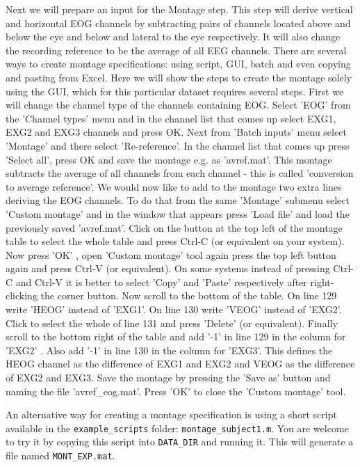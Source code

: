 Next we will prepare an input for the Montage step. This step will derive vertical and horizontal EOG channels by subtracting pairs of channels located above and below the eye and below and lateral to the eye respectively. It will also change the recording reference to be the average of all EEG channels. There are several ways to create montage specifications: using script, GUI, batch and even copying and pasting from Excel. Here we will show the steps to create the montage solely using the GUI, which for this particular dataset requires several steps. First we will change the channel type of the channels containing EOG. Select  'EOG' from the 'Channel types' menu and in the channel list that comes up select EXG1, EXG2 and EXG3 channels and press OK. Next  from 'Batch inputs' menu select 'Montage' and there select 'Re-reference'. In the channel list that comes up press 'Select all', press OK and save the montage e.g. as 'avref.mat'. This montage subtracts the average of all channels from each channel - this is called 'conversion to average reference'. We would now like to add to the montage two extra lines deriving the EOG channels. To do that from the same 'Montage' submenu select 'Custom montage' and in the window that appears press 'Load file' and load the previously saved 'avref.mat'.  Click on the button at the top left of the montage table to select the whole table and press Ctrl-C (or equivalent on your system). Now press 'OK' , open 'Custom montage' tool again press the top left button again and press Ctrl-V (or equivalent). On some systems instead of pressing Ctrl-C and Ctrl-V it is better to select 'Copy' and 'Paste' respectively after right-clicking the corner button.   Now scroll to the bottom of the table. On line 129 write 'HEOG' instead of 'EXG1'. On line 130 write 'VEOG' instead of 'EXG2'. Click to select the whole of line 131 and press 'Delete' (or equivalent). Finally scroll to the bottom right of the table and  add '-1' in line 129 in the column for 'EXG2' . Also add '-1' in line 130 in the column for 'EXG3'. This defines the HEOG channel as the difference of EXG1 and EXG2 and VEOG as the difference of EXG2 and EXG3. Save the montage by  pressing the 'Save as' button and naming the file 'avref\_eog.mat'. Press 'OK' to close the 'Custom montage' tool.

An alternative way for creating a montage specification is using a short script available in the \texttt{example\_scripts} folder: \texttt{montage\_subject1.m}. You are welcome to try it by copying this script into \texttt{DATA\_DIR} and running it. This will generate a file named \texttt{MONT\_EXP.mat}.

